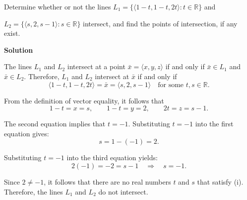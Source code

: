 \begin{examplebox}
Determine whether or not the lines \(L_1 = \{ \langle 1 - t, 1 - t, 2t \rangle : t \in \mathbb{R} \}\) and 

\(L_2 = \{ \langle s, 2, s - 1 \rangle : s \in \mathbb{R} \}\) intersect, and find the points of intersection, if any exist.

\vspace{0.5em}

\textbf{Solution}

\vspace{0.5em}

The lines \(L_1\) and \(L_2\) intersect at a point \(\bar{x} = \langle x, y, z \rangle\) if and only if \(\bar{x} \in L_1\) and \(\bar{x} \in L_2\). Therefore, \(L_1\) and \(L_2\) intersect at \(\bar{x}\) if and only if
\[
\langle 1 - t, 1 - t, 2t \rangle = \bar{x} = \langle s, 2, s - 1 \rangle \quad \text{for some } t, s \in \mathbb{R}. \tag{i}
\]

From the definition of vector equality, it follows that
\[
1 - t = x = s, \qquad 1 - t = y = 2, \qquad 2t = z = s - 1.
\]

The second equation implies that \(t = -1\). Substituting \(t = -1\) into the first equation gives:
\[
s = 1 - (-1) = 2.
\]

Substituting \(t = -1\) into the third equation yields:
\[
2(-1) = -2 = s - 1 \quad \Rightarrow \quad s = -1.
\]

Since \(2 \neq -1\), it follows that there are no real numbers \(t\) and \(s\) that satisfy (i). Therefore, the lines \(L_1\) and \(L_2\) do not intersect.
\end{examplebox}

